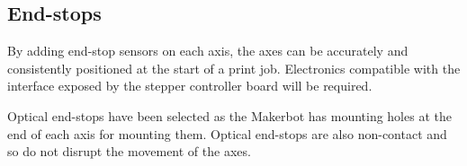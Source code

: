 		\subsection{End-stops}
			
			By adding end-stop sensors on each axis, the axes can be accurately and
			consistently positioned at the start of a print job. Electronics
			compatible with the interface exposed by the stepper controller board will
			be required.
			
			Optical end-stops have been selected as the Makerbot has mounting holes at
			the end of each axis for mounting them.  Optical end-stops are also
			non-contact and so do not disrupt the movement of the axes.
			
